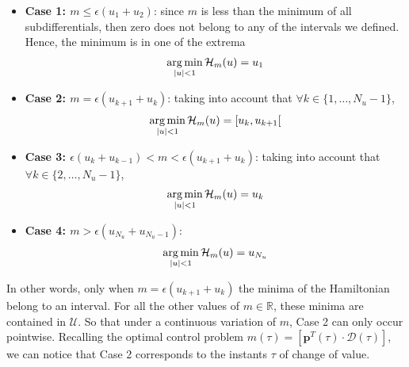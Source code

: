 \begin{itemize}
    \item \textbf{Case 1: $m \leq \epsilon(u_1+u_2)$}: since $m$ is less than the  minimum of all subdifferentials, then zero does not belong to any of the intervals we defined. Hence, the minimum is in one of the extrema
    \begin{gather}
        \operatorname*{arg\,min}_{|u| < 1} \mathcal{H}_m(u) = u_1
    \end{gather} 
    \item \textbf{Case 2: $m = \epsilon(u_{k+1}+u_k) $}: taking into account that $\forall k \in \{1,\dots,N_u-1\}$,
    \begin{gather}
        \operatorname*{arg\,min}_{|u| < 1} \mathcal{H}_m(u) = [u_k,u_{k+1}[ 
    \end{gather} 
    \item \textbf{Case 3: $\epsilon(u_k+u_{k-1})<m<\epsilon(u_{k+1}+u_k)$}: taking into account that $\forall k \in \{2,\dots,N_u-1\}$,
    \begin{gather}
        \operatorname*{arg\,min}_{|u| < 1} \mathcal{H}_m(u) = u_k
    \end{gather}
    \item \textbf{Case 4: $m>\epsilon(u_{N_u}+u_{N_u-1})$}:
    \begin{gather}
        \operatorname*{arg\,min}_{|u| < 1} \mathcal{H}_m(u) = u_{N_u}
    \end{gather} 
\end{itemize}

In other words, only when $m = \epsilon(u_{k+1}+u_k)$ the minima of the Hamiltonian belong to an interval. For all the other values of $m\in\mathbb{R}$, these minima are contained in $\mathcal{U}$. So that under a continuous variation of $m$, Case 2 can only occur pointwise. Recalling the optimal control problem $m(\tau) = [\bm{p}^T(\tau) \cdot \bm{\mathcal{D}}(\tau)]$, we can notice that Case 2 corresponds to the instants $\tau$ of change of value.